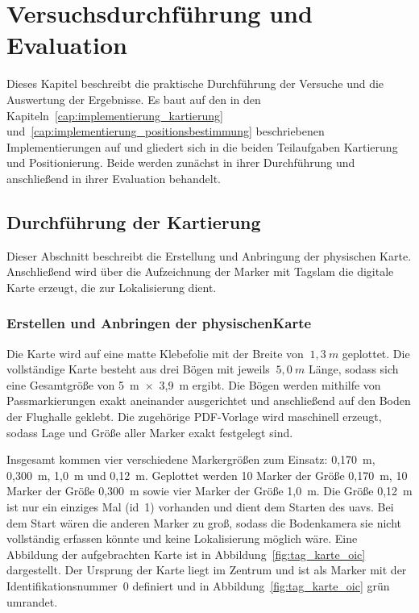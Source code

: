 
\chapter{Versuchsdurchführung und Evaluation}
\label{cap:versuchsdurchführung}
Dieses Kapitel beschreibt die praktische Durchführung der Versuche und die Auswertung der Ergebnisse.
Es baut auf den in den Kapiteln~\ref{cap:implementierung_kartierung} und~\ref{cap:implementierung_positionsbestimmung} beschriebenen Implementierungen auf und gliedert sich in die beiden Teilaufgaben Kartierung und Positionierung.
Beide werden zunächst in ihrer Durchführung und anschließend in ihrer Evaluation behandelt.




\section{Durchführung der Kartierung}
\label{sec:durchfuehrung_kartierung}
Dieser Abschnitt beschreibt die Erstellung und Anbringung der physischen Karte.
Anschließend wird über die Aufzeichnung der Marker mit Tag\gls{slam} die digitale Karte erzeugt, die zur Lokalisierung dient.

\subsection{Erstellen und Anbringen der physischenKarte}
\label{sec:anbringen_karte}
Die Karte wird auf eine matte Klebefolie mit der Breite von $~1,3~m$ geplottet.
Die vollständige Karte besteht aus drei Bögen mit jeweils $~5,0~m$ Länge, sodass sich eine Gesamtgröße von 5~m~$\times$~3,9~m ergibt.
Die Bögen werden mithilfe von Passmarkierungen exakt aneinander ausgerichtet und anschließend auf den Boden der Flughalle geklebt. 
Die zugehörige PDF-Vorlage wird maschinell erzeugt, sodass Lage und Größe aller Marker exakt festgelegt sind.

Insgesamt kommen vier verschiedene Markergrößen zum Einsatz: 0,170~m, 0,300~m, 1,0~m und 0,12~m.
Geplottet werden 10 Marker der Größe 0,170~m, 10 Marker der Größe 0,300~m sowie vier Marker der Größe 1,0~m.
Die Größe 0,12~m ist nur ein einziges Mal (\gls{id}~1) vorhanden und dient dem Starten des \gls{uav}s.
Bei dem Start wären die anderen Marker zu groß, sodass die Bodenkamera sie nicht vollständig erfassen könnte und keine Lokalisierung möglich wäre.
Eine Abbildung der aufgebrachten Karte ist in Abbildung~\ref{fig:tag_karte_oic} dargestellt.
Der Ursprung der Karte liegt im Zentrum und ist als Marker mit der Identifikationsnummer~0 definiert und in Abbildung~\ref{fig:tag_karte_oic} grün umrandet.

